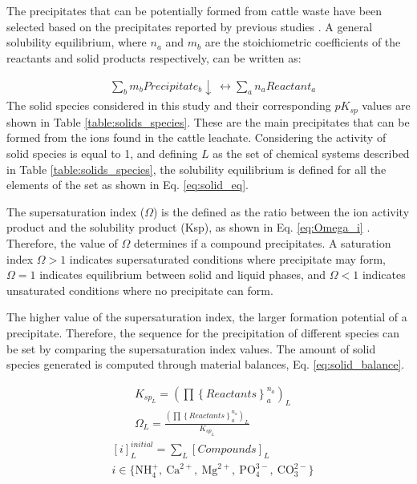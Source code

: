 \begin{refsection}[referencesCh3]
The precipitates that can be potentially formed from cattle waste have been selected based on the precipitates reported by previous studies \citep{Tao, Harada, gadekar2010validation}. A general solubility equilibrium, where $n_{a}$ and $m_{b}$ are the stoichiometric coefficients of the reactants and solid products respectively, can be written as:

\begin{align}
& \sum_{b} m_{b} Precipitate_{b}\downarrow  \ \leftrightarrow \sum_{a} n_{a} Reactant_{a}
\end{align}
The solid species considered in this study and their corresponding $pK_{sp}$ values are shown in Table \ref{table:solids_species}. These are the main precipitates that can be formed from the ions found in the cattle leachate. Considering the activity of solid species is equal to 1, and defining $L$ as the set of chemical systems described in Table \ref{table:solids_species}, the solubility equilibrium is defined for all the elements of the set as shown in Eq. \ref{eq:solid_eq}.

The supersaturation index ($\Omega$) is the defined as the ratio between the ion activity product and the solubility product (Ksp), as shown in Eq. \ref{eq:Omega_i} \citep{Tao}. Therefore, the value of $\Omega$ determines if a compound precipitates. A saturation index $\Omega > 1$ indicates supersaturated conditions where precipitate may form, $\Omega =1 $ indicates equilibrium between solid and liquid phases, and $\Omega < 1$ indicates unsaturated conditions where no precipitate can form. 

The higher value of the supersaturation index, the larger formation potential of a precipitate. Therefore, the sequence for the precipitation of different species can be set by comparing the supersaturation index values. The amount of solid species generated is computed through material balances, Eq. \ref{eq:solid_balance}.

\begin{align} 
& K_{sp_{L}}   = \left( \prod \left\{ Reactants \right\}_{a}^{n_{a}} \right)_{L} \label{eq:solid_eq}\\
& \Omega_{L}= \frac{ \left( \prod \left\{ Reactants \right\}_{a}^{n_{a}} \right)_{L} }{ K_{sp_{L}}  } \label{eq:Omega_i}
\end{align}
\begin{align}
& \left[ i \right]_{L}^{initial} =  \sum_{L} \left[Compounds\right]_{L} \label{eq:solid_balance} \\
& i \in \bigl\{\text{NH}_{4}^{+}, \ \text{Ca}^{2+}, \ \text{Mg}^{2+}, \ \text{PO}_{4}^{3-}, \ \text{CO}_{3}^{2-} \bigr\} \nonumber 
\end{align}


\end{refsection}
